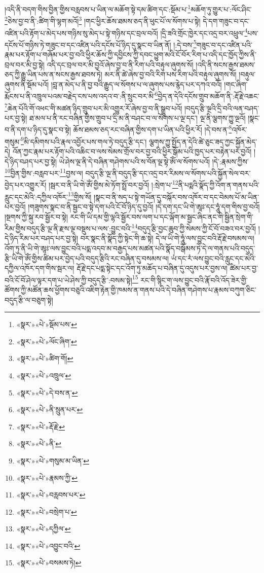 །འདི་ནི་བདག་གིས་བྱིན་གྱིས་བརླབས་པ་ཡིན་ལ་མཆོག་སྟེ་དམ་ཚིག་དང་:སྡོམ་པ་\footnote{«སྣར་»«པེ་»སྡོམ་པས་}མཆོག་ཏུ་གྱུར་པ་:ལོང་ཤིང་\footnote{«སྣར་»«པེ་»ལོང་ཞིག་}ཅེས་བྱ་བ་ནི་:ཚིག་གི་ལྷག་མའོ།\footnote{«སྣར་»«པེ་»ཚིག་གོ།} །གང་ཕྱིར་ཆོས་ཐམས་ཅད་ནི་ཕུང་པོ་ལ་སོགས་པ་སྟེ། དེ་དག་གཟུང་བ་དང་འཛིན་པའི་རྟོག་པ་མེད་པས་གཉིས་སུ་མེད་པ་སྟེ་གཉིས་དང་བྲལ་བའོ། །དྲི་ཟའི་གྲོང་ཁྱེར་དང་འདྲ་བར་འཕྲུལ་\footnote{«སྣར་»«པེ་»འཁྲུལ་}པས་དངོས་པོ་གཉིས་ཏེ་གཟུང་བ་དང་འཛིན་པའི་དངོས་པོ་ཉིད་དུ་སྣང་བ་ཡིན་ནོ། །:དེ་བས་\footnote{«སྣར་»«པེ་»དེ་བས་ན་}གཟུང་བ་དང་འཛིན་པའི་རྣམ་པར་རྟོག་པ་གཞོམ་པར་བྱ་བའི་ཕྱིར་ཆོས་ཀྱི་དབྱིངས་ཀྱི་དབང་ཕྱུག་མའི་ངོ་བོར་རིག་པ་འདི་དང་ཁྱོད་ཀྱིས་ནི་བྲལ་བར་མི་བྱ་སྟེ། འདི་དང་བྲལ་བར་མི་བྱའོ་ཞེས་བྱ་བ་ནི་རིག་པའི་བརྟུལ་ཞུགས་སོ། །འདི་ནི་སངས་རྒྱས་ཐམས་ཅད་ཀྱི་རྒྱུ་ཡིན་པས་ན་སངས་རྒྱས་ཐབས་ཏེ། མར་ནི་ཚེ་ཞེས་བྱ་བའི་རིག་པས་རིག་པའི་བརྟུལ་ཞུགས་སོ། །བརྟུལ་ཞུགས་ནི་སྡོམ་པའོ། །བླ་ན་མེད་པ་ནི་བྱ་བའི་རྒྱུད་ལ་སོགས་པ་ལ་ཞུགས་པས་རྙེད་པར་དཀའ་བའོ། །གང་ཞིག་རྨོངས་པ་ནི་འཁྲུལ་པའམ་བརྗེད་ངས་པས་འདའ་བ་:ནི་སྲུང་བར་མི་\footnote{«སྣར་»«པེ་»ནི་སྲུན་པར་}བྱེད་ན་དེའི་དངོས་གྲུབ་མཆོག་ནི་:རྡོ་རྗེ་འཆང་\footnote{«སྣར་»«པེ་»རྡོ་རྗེ་}ཆེན་པོའི་གོ་འཕང་གི་མཚན་ཉིད་གྲུབ་པར་མི་འགྱུར་རོ་ཞེས་བྱ་བ་ནི་སྒྲུབ་པའོ། །བདུད་རྩི་ལྔའི་དྲི་བའི་ལན་བཤད་པར་བྱ་སྟེ། ཐ་མལ་པ་ནི་རང་བཞིན་གྱིས་གྲུབ་པ་དྲི་མ་ནི་བཤང་བ་ལ་སོགས་པ་ལྔ་དང་། ལྔ་ནི་ལྕགས་ཀྱུ་ལྔའོ། །སྣང་བ་ནི་དག་པ་ཉིད་དུ་སྣང་བ་སྟེ། ཆོས་ཐམས་ཅད་རང་བཞིན་གྱིས་དག་པ་ཡིན་པའི་ཕྱིར་རོ། །དེ་བས་ན་\footnote{«སྣར་»«པེ་»ནི་}འཁོར་གསུམ་\footnote{«སྣར་»«པེ་»གསུམ་མ་ཡིན་}མི་དམིགས་པའི་རྣལ་འབྱོར་པས་གལ་ཏེ་བདུད་རྩི་དང་། ལྕགས་ཀྱུ་སྤྱོད་ན་དེའི་ཚེ་ཅུང་ཟད་ཀྱང་སྐྱོན་མེད་དེ། འོན་ཀྱང་རྣམ་པར་རྟོག་པའི་འཆིང་བ་ལས་སེམས་གྲོལ་བར་བྱ་བའི་ཕྱིར་སྒོམ་པའི་ཁྱད་པར་བརྟེན་པར་བྱའོ། །དེ་ཉིད་བཤད་པར་བྱ་སྟེ། ཡེ་ཤེས་ལྔ་ནི་དེ་བཞིན་གཤེགས་པའི་ས་བོན་ལྔ་སྟེ་ཨོཾ་ལ་སོགས་པའོ། །དེ་:རྣམས་ཀྱིས་\footnote{«སྣར་»«པེ་»རྣམས་ཀྱི་}བྱིན་གྱིས་:བརླབ་པར་\footnote{«སྣར་»«པེ་»བརླབས་པར་}བྱས་ལ། བདུད་རྩི་ལྔ་ནི་བདུད་རྩི་དང་འདྲ་བར་རིམས་ལ་སོགས་པའི་སྐྱོན་སེལ་བར་བྱེད་པར་འགྱུར་རོ། །སྦར་བ་ནི་ཡི་གེ་ཨོཾ་གྱིས་མེ་ཏོག་སྤྲོ་བར་བྱའོ། །:སྲེག་པ་\footnote{«སྣར་»«པེ་»བསྲེག་པ་}ནི་པདྨའི་སྣོད་ཀྱི་འོག་ན་གནས་པའི་རླུང་དང་མེའི་:དཀྱིལ་འཁོར་\footnote{«སྣར་»«པེ་»དཀྱིལ་}གྱིས་སོ། །སྣང་བ་ནི་སད་པ་སྟེ་གཡོན་དུ་བསྐོར་བས་འཁོར་བ་དང་བེམས་པོ་མ་ཡིན་པར་བྱའོ། །གཟུགས་སྣང་བ་ནི་སྦྱང་བ་སྟེ་དག་པའི་ངོ་བོ་ཉིད་དུ་བྱའོ། །དེ་དག་དང་ཡི་གེ་ཨཱཿ་དང་ཧཱུཾ་དག་གིས་བྱ་བའོ། །སྔགས་ཀྱི་སྐུ་རབ་སྦྱོར་བ་སྟེ། རང་གི་ཡི་དམ་གྱི་ལྷའི་སྦྱོར་བས་ལག་པ་དང་ལྐོག་མ་སྦྱང་ཞིང་ནང་གི་སྦྱིན་སྲེག་གི་རིམ་གྱིས་བདུད་རྩི་ལྔ་ནི་རྫས་ལྔ་བསྡུས་པ་ལས་:བྱུང་བའི་\footnote{«སྣར་»«པེ་»འབྱུང་བའི་}བདུད་རྩི་བྱང་ཆུབ་ཀྱི་སེམས་ཀྱི་ངོ་བོ་བཟའ་བར་བྱའོ། །དེ་ཉིད་རིམ་པར་བཤད་པར་བྱ་སྟེ། བར་སྣང་ནི་སྣོད་ཀྱི་སྟེང་གི་ཆ་སྟེ། དེ་ལ་ཡི་གེ་ཧཱུཾ་ལས་བྱུང་བའི་རྡོ་རྗེ་བསམས་ལ། འོག་ཏུ་ནི་ཡི་གེ་ཨཱཿ་ལས་བྱུང་བའི་པདྨ་འདབ་མ་བརྒྱད་པས་མཚན་པའི་སྣོད་བསྒོམས་ཏེ་དེ་ལ་གནས་པའི་བདུད་རྩི་ཡི་གེ་ཨོཾ་གྱིས་ཚིམ་པར་བྱེད་པའི་བདུད་རྩིའི་རང་བཞིན་དུ་བསམས་ལ། ཡཾ་དང་རཾ་ལས་བྱུང་བའི་རླུང་དང་མེའི་དཀྱིལ་འཁོར་དག་གིས་སྦར་ལ། རྡོ་རྗེ་དང་པདྨ་སྟེང་དང་འོག་ཏུ་མཆོད་པ་བཞིན་དུ་འདུས་པར་བྱས་ལ། ཚིམ་པར་བྱ་བའི་ངོ་བོ་ཤེལ་ལྟར་དག་པ་ཡེ་ཤེས་ཀྱི་བདུད་རྩི་:བསམ་སྟེ།\footnote{«སྣར་»«པེ་»བསམས་ཏེ།} རང་གི་སྙིང་ག་ལས་བྱུང་བའི་རྣོ་བའི་འོད་ཟེར་གྱི་ཚོགས་ཀྱི་མཚོན་ཆས་ཕྱོགས་བཅུའི་འཇིག་རྟེན་གྱི་ཁམས་ན་གནས་པའི་དེ་བཞིན་གཤེགས་པ་རྣམས་བཀུག་ཅིང་བདུད་རྩི་ལ་བཅུག་སྟེ། 